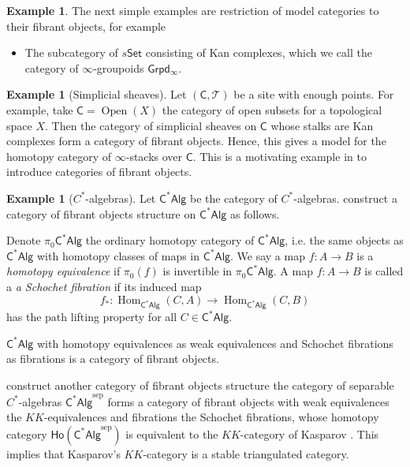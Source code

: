 \documentclass[12pt]{amsart}
\theoremstyle{definition}
\newtheorem{example}[thm]{Example}
\theoremstyle{remark}
\numberwithin{equation}{section}
\newcommand{\CC}{{\mathsf C}}
\newcommand{\1}{{\mathbb{1}}}
\newcommand{\set}{\mathsf{Set}}
\newcommand{\ho}{\mathsf{Ho}}
\newcommand{\cstar}{\mathsf{C^*Alg}}
\newcommand{\igpd}{\mathsf{Grpd_{\infty}}}
\newcommand{\open}{\operatorname{Open}}
\newcommand{\Hom}{\operatorname{Hom}}
\newcommand{\sep}{{\operatorname{sep}}}
\begin{document}
\begin{example}
    The next simple examples are restriction of model categories to their fibrant objects, for example
    \begin{itemize}
        \item The subcategory of $s\set$ consisting of Kan complexes, which we call the category of $\infty$-groupoids $\igpd$.
    \end{itemize}
\end{example}

\begin{example}[Simplicial sheaves]
    Let $(\CC, \mathcal{T})$ be a site with enough points. For example, take $\CC = \open(X)$ the category of open subsets for a topological space $X$. Then the category of simplicial sheaves on $\CC$  whose stalks are Kan complexes form a category of fibrant objects. Hence, this gives a model for the homotopy category of $\infty$-stacks over $\CC$. This is a motivating example in \cite{Bro73} to introduce categories of fibrant objects. 
\end{example}

\begin{example}[$C^*$-algebras]
    Let $\cstar$ be the category of $C^*$-algebras. \cite{Sch84} construct a category of fibrant objects structure on  $\cstar$ as follows. 
    
    Denote $\pi_0 \cstar$ the ordinary homotopy category of $\cstar$, i.e. the same objects as $\cstar$ with homotopy classes of maps in $\cstar$. We say a map $f:A\to B$ is a {\it homotopy equivalence} if $\pi_0(f)$ is invertible in $\pi_0 \cstar$. A map $f:A\to B$ is called a {\it a Schochet fibration} if its induced map
    $$
    f_*:\Hom_{\cstar}(C, A) \to \Hom_{\cstar}(C, B) 
    $$
    has the path lifting property for all $C\in \cstar$. 
    
     $\cstar$ with homotopy equivalences as weak equivalences and Schochet fibrations as fibrations is a category of fibrant objects. 
     
     \cite{UUY} construct another category of fibrant objects structure the category of separable $C^{*}$-algebras $\cstar^{\sep}$ forms a category of fibrant objects with weak equivalences the $KK$-equivalences and fibrations the Schochet fibrations, whose homotopy category $\ho(\cstar^{\sep})$ is equivalent to the $KK$-category of Kasparov \cite{Kas07}. This implies that Kasparov’s $KK$-category is a stable triangulated category.
\end{example}
\end{document}
